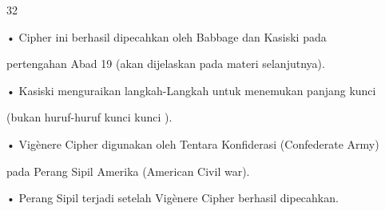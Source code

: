 \documentclass{article}
\begin{document}

32

• Cipher ini  berhasil dipecahkan oleh Babbage dan Kasiski pada 

pertengahan Abad 19 (akan dijelaskan pada materi selanjutnya). 

• Kasiski menguraikan langkah-Langkah untuk menemukan panjang kunci 

(bukan huruf-huruf kunci kunci ). 

• Vigènere Cipher digunakan oleh Tentara Konfiderasi (Confederate Army) 

pada Perang Sipil Amerika (American Civil war). 

• Perang Sipil terjadi setelah Vigènere Cipher berhasil dipecahkan.
\end{document}
